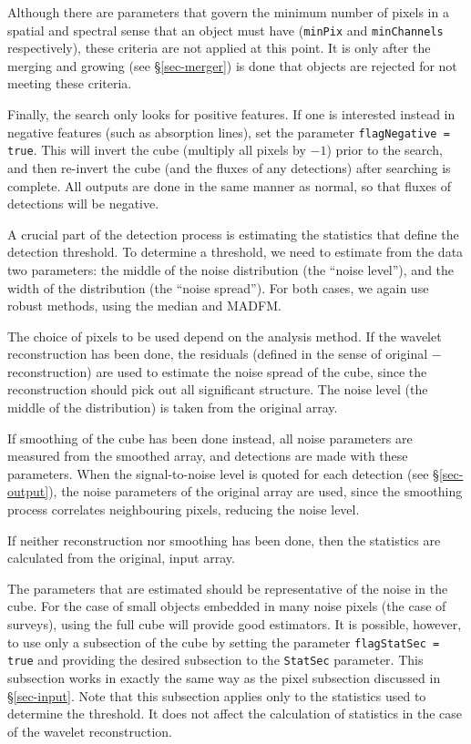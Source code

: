 Although there are parameters that govern the minimum number of pixels
in a spatial and spectral sense that an object must have
(\texttt{minPix} and \texttt{minChannels} respectively), these
criteria are not applied at this point. It is only after the merging
and growing (see \S\ref{sec-merger}) is done that objects are rejected
for not meeting these criteria.

Finally, the search only looks for positive features. If one is
interested instead in negative features (such as absorption lines),
set the parameter \texttt{flagNegative = true}. This will invert the
cube (\ie multiply all pixels by $-1$) prior to the search, and then
re-invert the cube (and the fluxes of any detections) after searching
is complete. All outputs are done in the same manner as normal, so
that fluxes of detections will be negative.


A crucial part of the detection process is estimating the statistics
that define the detection threshold. To determine a threshold, we need
to estimate from the data two parameters: the middle of the noise
distribution (the ``noise level''), and the width of the distribution
(the ``noise spread''). For both cases, we again use robust methods,
using the median and MADFM.

The choice of pixels to be used depend on the analysis method. If the
wavelet reconstruction has been done, the residuals (defined
in the sense of original $-$ reconstruction) are used to estimate the
noise spread of the cube, since the reconstruction should pick out
all significant structure. The noise level (the middle of the
distribution) is taken from the original array.

If smoothing of the cube has been done instead, all noise parameters
are measured from the smoothed array, and detections are made with
these parameters. When the signal-to-noise level is quoted for each
detection (see \S\ref{sec-output}), the noise parameters of the
original array are used, since the smoothing process correlates
neighbouring pixels, reducing the noise level.

If neither reconstruction nor smoothing has been done, then the
statistics are calculated from the original, input array. 

The parameters that are estimated should be representative of the
noise in the cube. For the case of small objects embedded in many
noise pixels (\eg the case of \hi surveys), using the full cube will
provide good estimators. It is possible, however, to use only a
subsection of the cube by setting the parameter \texttt{flagStatSec =
true} and providing the desired subsection to the \texttt{StatSec}
parameter. This subsection works in exactly the same way as the pixel
subsection discussed in \S\ref{sec-input}. Note that this subsection
applies only to the statistics used to determine the threshold. It
does not affect the calculation of statistics in the case of the
wavelet reconstruction.

